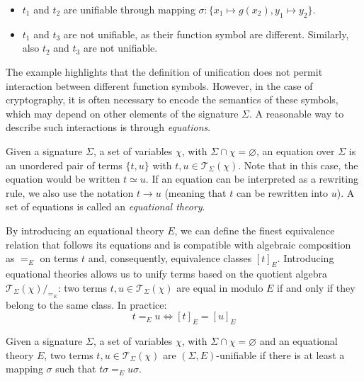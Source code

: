 \begin{itemize}
    \item $t_1$ and $t_2$ are unifiable through mapping $\sigma : \{ x_1 \mapsto g(x_2), y_1 \mapsto y_2 \}$.
    \item $t_1$ and $t_3$ are not unifiable, as their function symbol are different. Similarly, also $t_2$ and $t_3$ are not unifiable.
\end{itemize}

The example highlights that the definition of unification does not permit interaction between different function symbols. However, in the case of cryptography, it is often necessary to encode the semantics of these symbols, which may depend on other elements of the signature $\Sigma$. A reasonable way to describe such interactions is through \textit{equations}.

\begin{definition}
    Given a signature $\Sigma$, a set of variables $\chi$, with $\Sigma \cap \chi = \varnothing$, an equation over $\Sigma$ is an unordered pair of terms $\{t,u\}$ with $t,u \in \mathcal{T}_{\Sigma}(\chi)$. Note that in this case, the equation would be written $t \simeq u$. If an equation can be interpreted as a rewriting rule, we also use the notation $t \to u$ (meaning that $t$ can be rewritten into $u$). A set of equations is called an \textit{equational theory}.
\end{definition}

By introducing an equational theory $E$, we can define the finest equivalence relation that follows its equations and is compatible with algebraic composition as $=_E$ on terms $t$ and, consequently, equivalence classes $[t]_E$. Introducing equational theories allows us to unify terms based on the quotient algebra $\mathcal{T}_{\Sigma}(\chi) /_{=_E}$: two terms $t,u \in \mathcal{T}_{\Sigma}(\chi)$ are equal in modulo $E$ if and only if they belong to the same class. In practice:
\begin{equation*}
    t =_E u \iff [t]_E = [u]_E
\end{equation*}

\begin{definition}
    Given a signature $\Sigma$, a set of variables $\chi$, with $\Sigma \cap \chi = \varnothing$ and an equational theory $E$, two terms $t,u \in \mathcal{T}_{\Sigma}(\chi)$ are $(\Sigma,E)$-unifiable if there is at least a mapping $\sigma$ such that $t\sigma =_E u\sigma$.
\end{definition}

